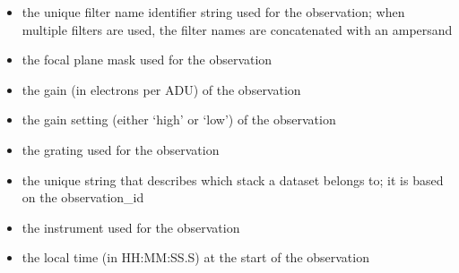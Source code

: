 \documentclass[letterpaper,10pt,english]{sphinxmanual}
\begin{document}
\begin{itemize}
\item {} 
the unique filter name identifier string used for the observation; when
multiple filters are used, the filter names are concatenated with an
ampersand

\end{itemize}

\begin{itemize}
\item {} 
the focal plane mask used for the observation

\end{itemize}

\begin{itemize}
\item {} 
the gain (in electrons per ADU) of the observation

\end{itemize}

\begin{itemize}
\item {} 
the gain setting (either `high' or `low') of the observation

\end{itemize}

\begin{itemize}
\item {} 
the grating used for the observation

\end{itemize}

\begin{itemize}
\item {} 
the unique string that describes which stack a dataset belongs to; it is
based on the observation\_id

\end{itemize}

\begin{itemize}
\item {} 
the instrument used for the observation

\end{itemize}

\begin{itemize}
\item {} 
the local time (in HH:MM:SS.S) at the start of the observation

\end{itemize}
\end{document}
